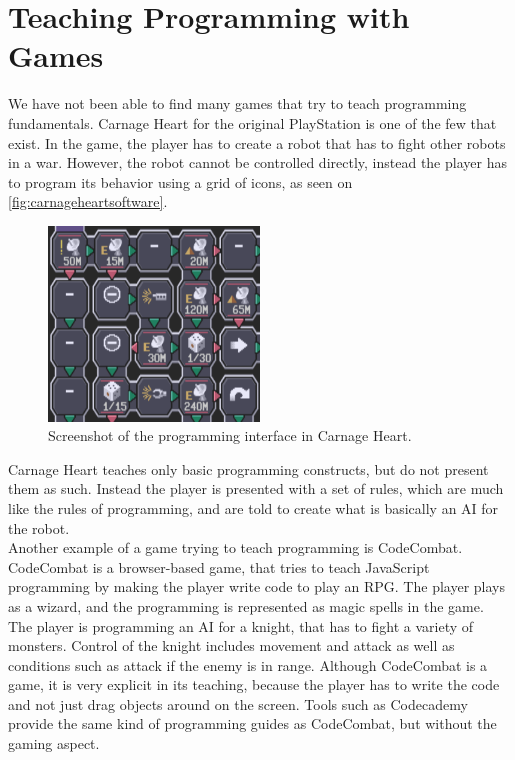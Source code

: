 \section{Teaching Programming with Games}
\label{sec:teachProgWithGames}
We have not been able to find many games that try to teach programming fundamentals. Carnage Heart for the original PlayStation is one of the few that exist. In the game, the player has to create a robot that has to fight other robots in a war. However, the robot cannot be controlled directly, instead the player has to program its behavior using a grid of icons, as seen on \autoref{fig:carnageheartsoftware}.

\begin{figure}[h]
  \centering
    \includegraphics[width=0.5\textwidth]{img/CarnageHeartSoftware.png}
  \caption{Screenshot of the programming interface in Carnage Heart.\cite{carnageheartsoftware}}
  \label{fig:carnageheartsoftware}
\end{figure}

Carnage Heart teaches only basic programming constructs, but do not present them as such. Instead the player is presented with a set of rules, which are much like the rules of programming, and are told to create what is basically an AI for the robot.\\

Another example of a game trying to teach programming is CodeCombat. \cite{codecombat} CodeCombat is a browser-based game, that tries to teach JavaScript programming by making the player write code to play an RPG. The player plays as a wizard, and the programming is represented as magic spells in the game. The player is programming an AI for a knight, that has to fight a variety of monsters. Control of the knight includes movement and attack as well as conditions such as attack if the enemy is in range.
Although CodeCombat is a game, it is very explicit in its teaching, because the player has to write the code and not just drag objects around on the screen. Tools such as Codecademy provide the same kind of programming guides as CodeCombat, but without the gaming aspect.\cite{codecademy}\\

